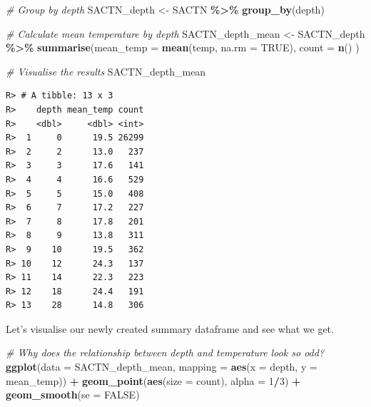 \documentclass[
]{book}
\newenvironment{Shaded}{\begin{snugshade}}{\end{snugshade}}
\newcommand{\CommentTok}[1]{\textcolor[rgb]{0.56,0.35,0.01}{\textit{#1}}}
\newcommand{\DataTypeTok}[1]{\textcolor[rgb]{0.13,0.29,0.53}{#1}}
\newcommand{\DecValTok}[1]{\textcolor[rgb]{0.00,0.00,0.81}{#1}}
\newcommand{\KeywordTok}[1]{\textcolor[rgb]{0.13,0.29,0.53}{\textbf{#1}}}
\newcommand{\NormalTok}[1]{#1}
\newcommand{\OperatorTok}[1]{\textcolor[rgb]{0.81,0.36,0.00}{\textbf{#1}}}
\newcommand{\OtherTok}[1]{\textcolor[rgb]{0.56,0.35,0.01}{#1}}
\newcommand{\StringTok}[1]{\textcolor[rgb]{0.31,0.60,0.02}{#1}}
\begin{document}
\begin{Shaded}
\begin{Highlighting}[]
\CommentTok{\# Group by depth}
\NormalTok{SACTN\_depth <{-}}\StringTok{ }\NormalTok{SACTN }\OperatorTok{\%>\%}\StringTok{ }
\StringTok{  }\KeywordTok{group\_by}\NormalTok{(depth)}

\CommentTok{\# Calculate mean temperature by depth}
\NormalTok{SACTN\_depth\_mean <{-}}\StringTok{ }\NormalTok{SACTN\_depth }\OperatorTok{\%>\%}\StringTok{ }
\StringTok{  }\KeywordTok{summarise}\NormalTok{(}\DataTypeTok{mean\_temp =} \KeywordTok{mean}\NormalTok{(temp, }\DataTypeTok{na.rm =} \OtherTok{TRUE}\NormalTok{),}
  \DataTypeTok{count =} \KeywordTok{n}\NormalTok{()}
\NormalTok{)}

\CommentTok{\# Visualise the results}
\NormalTok{SACTN\_depth\_mean}
\end{Highlighting}
\end{Shaded}

\begin{verbatim}
R> # A tibble: 13 x 3
R>    depth mean_temp count
R>    <dbl>     <dbl> <int>
R>  1     0      19.5 26299
R>  2     2      13.0   237
R>  3     3      17.6   141
R>  4     4      16.6   529
R>  5     5      15.0   408
R>  6     7      17.2   227
R>  7     8      17.8   201
R>  8     9      13.8   311
R>  9    10      19.5   362
R> 10    12      24.3   137
R> 11    14      22.3   223
R> 12    18      24.4   191
R> 13    28      14.8   306
\end{verbatim}

Let's visualise our newly created summary dataframe and see what we get.

\begin{Shaded}
\begin{Highlighting}[]
\CommentTok{\# Why does the relationship between depth and temperature look so odd?}
\KeywordTok{ggplot}\NormalTok{(}\DataTypeTok{data =}\NormalTok{ SACTN\_depth\_mean, }\DataTypeTok{mapping =} \KeywordTok{aes}\NormalTok{(}\DataTypeTok{x =}\NormalTok{ depth, }\DataTypeTok{y =}\NormalTok{ mean\_temp)) }\OperatorTok{+}
\StringTok{  }\KeywordTok{geom\_point}\NormalTok{(}\KeywordTok{aes}\NormalTok{(}\DataTypeTok{size =}\NormalTok{ count), }\DataTypeTok{alpha =} \DecValTok{1}\OperatorTok{/}\DecValTok{3}\NormalTok{) }\OperatorTok{+}
\StringTok{  }\KeywordTok{geom\_smooth}\NormalTok{(}\DataTypeTok{se =} \OtherTok{FALSE}\NormalTok{)}
\end{Highlighting}
\end{Shaded}
\end{document}
